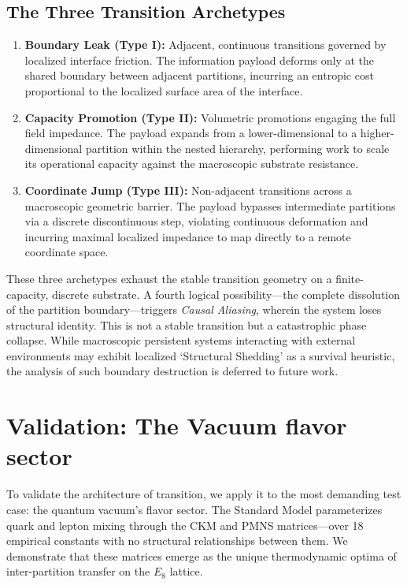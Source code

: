 \subsection{The Three Transition Archetypes}

\begin{enumerate}
    \item \textbf{Boundary Leak (Type I):} Adjacent, continuous transitions governed by localized interface friction. The information payload deforms only at the shared boundary between adjacent partitions, incurring an entropic cost proportional to the localized surface area of the interface.
    
    \item \textbf{Capacity Promotion (Type II):} Volumetric promotions engaging the full field impedance. The payload expands from a lower-dimensional to a higher-dimensional partition within the nested hierarchy, performing work to scale its operational capacity against the macroscopic substrate resistance.
    
    \item \textbf{Coordinate Jump (Type III):} Non-adjacent transitions across a macroscopic geometric barrier. The payload bypasses intermediate partitions via a discrete discontinuous step, violating continuous deformation and incurring maximal localized impedance to map directly to a remote coordinate space.
\end{enumerate}

These three archetypes exhaust the stable transition geometry on a finite-capacity, discrete substrate. A fourth logical possibility—the complete dissolution of the partition boundary—triggers \textit{Causal Aliasing}, wherein the system loses structural identity. This is not a stable transition but a catastrophic phase collapse. While macroscopic persistent systems interacting with external environments may exhibit localized `Structural Shedding' as a survival heuristic, the analysis of such boundary destruction is deferred to future work.




\section{Validation: The Vacuum flavor sector}
\label{sec:validation_flavor}

To validate the architecture of transition, we apply it to the most demanding test case: the quantum vacuum's flavor sector. The Standard Model parameterizes quark and lepton mixing through the CKM and PMNS matrices---over 18 empirical constants with no structural relationships between them. We demonstrate that these matrices emerge as the unique thermodynamic optima of inter-partition transfer on the $E_8$ lattice.

